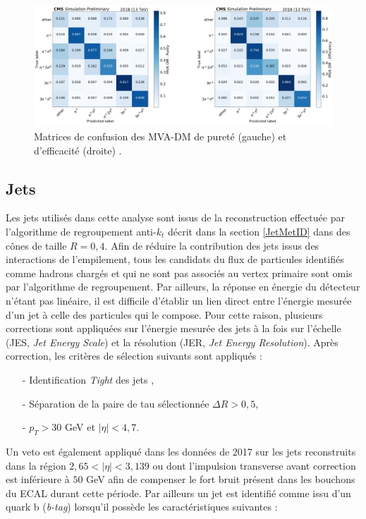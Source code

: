 \begin{figure}
\centering
    \includegraphics[scale=0.275]{Chapitre7/Images/confusionmatrixMVADM.png} 
    \caption{Matrices de confusion des MVA-DM\cite{mvadm} de pureté (gauche) et d'efficacité (droite) \cite{mvadm}.}
    \label{confusionMVADM}
\end{figure} 

\subsection{Jets}

Les jets utilisés dans cette analyse sont issus de la reconstruction effectuée par l'algorithme de regroupement anti-$k_t$ décrit dans la section \ref{JetMetID} dans des cônes de taille $R=0,4$. Afin de réduire la contribution des jets issus des interactions de l'empilement, tous les candidats du flux de particules identifiés comme hadrons chargés et qui ne sont pas associés au vertex primaire sont omis par l'algorithme de regroupement. Par ailleurs, la réponse en énergie du détecteur n'étant pas linéaire, il est difficile d'établir un lien direct entre l'énergie mesurée d'un jet à celle des particules qui le compose. Pour cette raison, plusieurs corrections sont appliquées sur l'énergie mesurée des jets à la fois sur l'échelle (JES, \textit{Jet Energy Scale}) et la résolution (JER, \textit{Jet Energy Resolution}). Après correction, les critères de sélection suivants sont appliqués : 

\begin{itemize}
    \bigskip
    \item[-] Identification \textit{Tight} des jets \cite{JetID},
    \smallskip
    \item[-] Séparation de la paire de tau sélectionnée $\Delta R>0,5$,
    \smallskip
    \item[-] $p_T>30$ GeV et $|\eta|<4,7$. 
    \bigskip
\end{itemize}

Un veto est également appliqué dans les données de 2017 sur les jets reconstruits dans la région $2,65<|\eta|<3,139$ ou dont l'impulsion transverse avant correction est inférieure à $50$ GeV afin de compenser le fort bruit présent dans les bouchons du ECAL durant cette période. Par ailleurs un jet est identifié comme issu d'un quark b (\textit{b-tag}) lorsqu'il possède les caractéristiques suivantes : 

